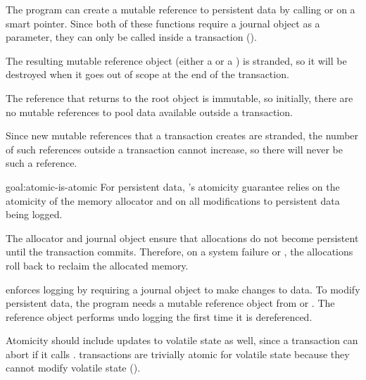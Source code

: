\begin{discuss}
  The program can create a mutable reference to persistent data by calling
   or  on a smart pointer.  Since both of
  these functions require a journal object as a parameter, they can only be called inside a
  transaction ().

  The resulting mutable reference object (either a  or a
  ) is stranded, so it will be destroyed when it goes out of
  scope at the end of the transaction.
  
  The reference that  returns to the root object is immutable, so
  initially, there are no mutable references to pool data available outside a
  transaction.

  Since new mutable references that a transaction creates are stranded, the
  number of such references outside a transaction cannot increase, so there
  will never be such a reference.
\end{discuss}

\begin{goaltrue}{goal:atomic-is-atomic}
  For persistent data, \This{}'s atomicity guarantee relies on the atomicity of
  the memory allocator and on all modifications to persistent data being
  logged.

  The allocator and journal object ensure that allocations do not become
  persistent until the transaction commits.  Therefore, on a system failure or
  , the allocations roll back to reclaim the allocated memory.  
  
  \This{} enforces logging by requiring a journal object to make changes to
  data.  To modify persistent data, the program needs a mutable reference
  object from  or .  The
  reference object performs undo logging the first time it is dereferenced.


  Atomicity should include updates to volatile state as well, since
  a transaction can abort if it calls .  \This{} transactions are
  trivially atomic for volatile state because they cannot modify volatile state
  ().

\end{goaltrue}


